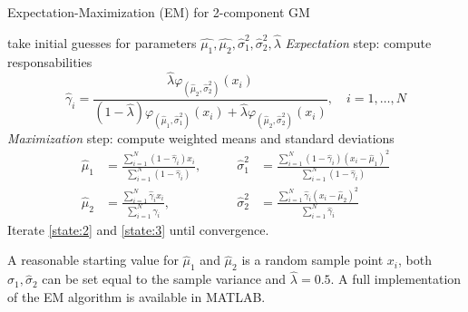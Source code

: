 \begin{algorithm}[H]
	\caption{Expectation-Maximization (EM) for 2-component GM}
	\begin{algorithmic}[1]
		\State take initial guesses for parameters $\widehat{\mu_1},\widehat{\mu_2},\widehat{\sigma}^2_1,\widehat{\sigma}^2_2, \widehat{\lambda}$
		\State\label{state:2} \textit{Expectation} step:  compute responsabilities
		\[ \widehat{\gamma}_i = \dfrac{\widehat{\lambda}\varphi_{(\widehat{\mu}_2,\widehat{\sigma}^2_2)}(x_i)}{(1-\widehat{\lambda})\varphi_{(\widehat{\mu}_1,\widehat{\sigma}^2_1)}(x_i) + \widehat{\lambda}\varphi_{(\widehat{\mu}_2,\widehat{\sigma}^2_2)}(x_i)},\quad i=1,\ldots,N  \]
		\State\label{state:3} \textit{Maximization} step: compute weighted means and standard deviations
		\begin{align*}
		\widehat{\mu}_1 & = \frac{\sum_{i=1}^{N}(1-\widehat{\gamma}_i)x_i}{\sum_{i=1}^{N}(1-\widehat{\gamma}_i)}, \qquad & \widehat{\sigma}^2_1 & = \frac{\sum_{i=1}^{N}(1-\widehat{\gamma}_i)(x_i-\widehat{\mu}_1)^2}{\sum_{i=1}^{N}(1-\widehat{\gamma}_i)}\\
		\widehat{\mu}_2 & = \frac{\sum_{i=1}^{N}\widehat{\gamma}_ix_i}{\sum_{i=1}^{N}\widehat{\gamma}_i}, \qquad & \widehat{\sigma}^2_2 & = \frac{\sum_{i=1}^{N}\widehat{\gamma}_i(x_i-\widehat{\mu}_2)^2}{\sum_{i=1}^{N}\widehat{\gamma}_i}
		\end{align*}
		\State Iterate \ref{state:2} and \ref{state:3} until convergence.
	\end{algorithmic}
\end{algorithm}
A reasonable starting value for $\widehat{\mu}_1$ and $\widehat{\mu}_2$ is a random sample point $x_i$, both $\widehat{\sigma}_1, \widehat{\sigma}_2$ can be set equal to the sample variance and $\widehat{\lambda} = 0.5$. A full implementation of the EM algorithm is available in MATLAB.

